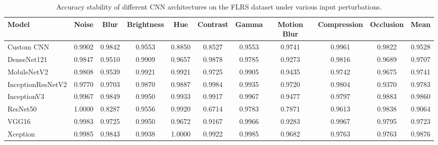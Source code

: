\documentclass[a4paper,fleqn]{cas-dc}
\begin{document}
\begin{table}[t]
\centering
\caption{Accuracy stability of different CNN architectures on the FLRS dataset under various input perturbations.}
\label{tab:accuracy_stability_tf_flowers}

\scriptsize
\setlength{\tabcolsep}{3pt}
\renewcommand{\arraystretch}{1.1}

\begin{tabular}{|l|ccccccccc|c|}
\hline
\textbf{Model} &
\textbf{Noise} &
\textbf{Blur} &
\textbf{Brightness} &
\textbf{Hue} &
\textbf{Contrast} &
\textbf{Gamma} &
\textbf{Motion Blur} &
\textbf{Compression} &
\textbf{Occlusion} &
\textbf{Mean} \\
\hline

Custom CNN
&0.9902&0.9842&0.9553&0.8850&0.8527&0.9553&0.9741&0.9961&0.9822&0.9528\\

DenseNet121
&0.9847&0.9510&0.9909&0.9657&0.9878&0.9785&0.9273&0.9816&0.9689&0.9707\\

MobileNetV2
&0.9808&0.9539&0.9921&0.9921&0.9725&0.9905&0.9435&0.9742&0.9675&0.9741\\

InceptionResNetV2
&0.9770&0.9703&0.9870&0.9887&0.9984&0.9935&0.9720&0.9804&0.9370&0.9783\\

InceptionV3
&0.9967&0.9849&0.9950&0.9933&0.9917&0.9967&0.9477&0.9797&0.9883&0.9860\\

ResNet50
&1.0000&0.8287&0.9556&0.9920&0.6714&0.9783&0.7871&0.9613&0.9838&0.9064\\

VGG16
&0.9983&0.9725&0.9950&0.9672&0.9167&0.9966&0.9283&0.9967&0.9795&0.9723\\

Xception
&0.9985&0.9843&0.9938&1.0000&0.9922&0.9985&0.9682&0.9763&0.9763&0.9876\\

\hline
\end{tabular}
\end{table}
\end{document}
